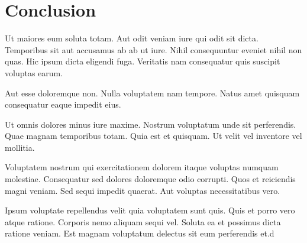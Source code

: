 \documentclass{plmmthesis}
\begin{document}
\chapter{Conclusion}

Ut maiores eum soluta totam. Aut odit veniam iure qui odit sit dicta. Temporibus sit aut accusamus
ab ab ut iure. Nihil consequuntur eveniet nihil non quas. Hic ipsum dicta eligendi fuga. Veritatis
nam consequatur quis suscipit voluptas earum.

Aut esse doloremque non. Nulla voluptatem nam tempore. Natus amet quisquam consequatur eaque impedit eius.

Ut omnis dolores minus iure maxime. Nostrum voluptatum unde sit perferendis. Quae magnam temporibus totam. Quia est et quisquam. Ut velit vel inventore vel mollitia.

Voluptatem nostrum qui exercitationem dolorem itaque voluptas numquam molestiae. Consequatur sed dolores doloremque odio corrupti. Quos et reiciendis magni veniam. Sed sequi impedit quaerat. Aut voluptas necessitatibus vero.

Ipsum voluptate repellendus velit quia voluptatem sunt quis. Quis et porro vero atque ratione. Corporis nemo aliquam sequi vel. Soluta ea et possimus dicta ratione veniam. Est magnam voluptatum delectus sit eum perferendis et.d


\appendix
\end{document}
